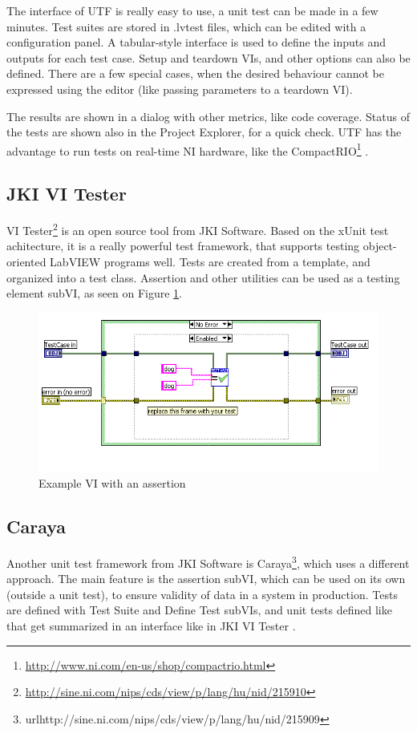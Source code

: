 The interface of UTF is really easy to use, a unit test can be made in a few minutes. Test suites are stored in .lvtest files, which can be edited with a configuration panel. A tabular-style interface is used to define the inputs and outputs for each test case. Setup and teardown VIs, and other options can also be defined. There are a few special cases, when the desired behaviour cannot be expressed using the editor (like passing parameters to a teardown VI).

The results are shown in a dialog with other metrics, like code coverage. Status of the tests are shown also in the Project Explorer, for a quick check. UTF has the advantage to run tests on real-time NI hardware, like the CompactRIO\footnote{\url{http://www.ni.com/en-us/shop/compactrio.html}} \cite{labview_utf}. 
\subsection{JKI VI Tester}
VI Tester\footnote{\url{http://sine.ni.com/nips/cds/view/p/lang/hu/nid/215910}} is an open source tool from JKI Software. Based on the xUnit test achitecture, it is a really powerful test framework, that supports testing object-oriented LabVIEW programs well. Tests are created from a template, and organized into a test class. Assertion and other utilities can be used as a testing element subVI, as seen on Figure \ref{fig:vitester}. \cite{vitesterwiki}
\begin{figure}
\centering
\includegraphics[width=120mm,keepaspectratio]{figures/vitester.png}
\caption{Example VI with an assertion} 
\label{fig:vitester}
\end{figure}
\subsection{Caraya}
Another unit test framework from JKI Software is Caraya\footnote{url{http://sine.ni.com/nips/cds/view/p/lang/hu/nid/215909}}, which uses a different approach. The main feature is the assertion subVI, which can be used on its own (outside a unit test), to ensure validity of data in a system in production. Tests are defined with Test Suite and Define Test subVIs, and unit tests defined like that get summarized in an interface like in JKI VI Tester \cite{carayapages}. 
